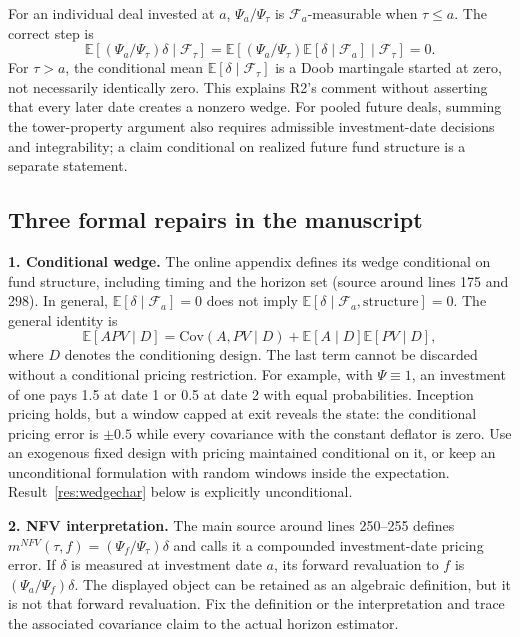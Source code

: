 \documentclass[11pt]{article}
\newcommand{\E}{\mathbb{E}}
\newcommand{\Cov}{\mathrm{Cov}}
\theoremstyle{plain}
\theoremstyle{definition}
\begin{document}
For an individual deal invested at $a$, $\Psi_a/\Psi_\tau$ is $\mathcal F_a$-measurable when $\tau\le a$. The correct step is
\[
\E[(\Psi_a/\Psi_\tau)\delta\mid\mathcal F_\tau]
=\E[(\Psi_a/\Psi_\tau)\E[\delta\mid\mathcal F_a]\mid\mathcal F_\tau]=0.
\]
For $\tau>a$, the conditional mean $\E[\delta\mid\mathcal F_\tau]$ is a Doob martingale started at zero, not necessarily identically zero. This explains R2's comment without asserting that every later date creates a nonzero wedge. For pooled future deals, summing the tower-property argument also requires admissible investment-date decisions and integrability; a claim conditional on realized future fund structure is a separate statement.

\subsection{Three formal repairs in the manuscript}
\label{sec:formal}

\textbf{1. Conditional wedge.} The online appendix defines its wedge conditional on fund structure, including timing and the horizon set (source around lines 175 and 298). In general, $\E[\delta\mid\mathcal F_a]=0$ does not imply $\E[\delta\mid\mathcal F_a,\text{structure}]=0$. The general identity is
\[
\E[APV\mid D]=\Cov(A,PV\mid D)+\E[A\mid D]\E[PV\mid D],
\]
where $D$ denotes the conditioning design. The last term cannot be discarded without a conditional pricing restriction. For example, with $\Psi\equiv1$, an investment of one pays 1.5 at date 1 or 0.5 at date 2 with equal probabilities. Inception pricing holds, but a window capped at exit reveals the state: the conditional pricing error is $\pm0.5$ while every covariance with the constant deflator is zero. Use an exogenous fixed design with pricing maintained conditional on it, or keep an unconditional formulation with random windows inside the expectation. Result~\ref{res:wedgechar} below is explicitly unconditional.

\textbf{2. NFV interpretation.} The main source around lines 250--255 defines $m^{NFV}(\tau,f)=(\Psi_f/\Psi_\tau)\delta$ and calls it a compounded investment-date pricing error. If $\delta$ is measured at investment date $a$, its forward revaluation to $f$ is $(\Psi_a/\Psi_f)\delta$. The displayed object can be retained as an algebraic definition, but it is not that forward revaluation. Fix the definition or the interpretation and trace the associated covariance claim to the actual horizon estimator.
\end{document}
